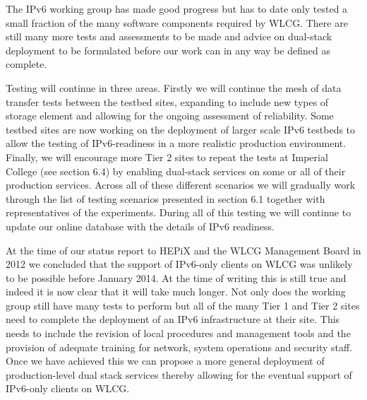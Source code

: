 The IPv6 working group has made good progress but has to date only tested a small fraction of the many 
software components required by WLCG. There are still many more tests and 
assessments to be made and advice on dual-stack deployment to be formulated before 
our work can in any way be defined as complete.

Testing will continue in three areas. Firstly we will continue the mesh of data transfer tests between
the testbed sites, expanding to include new types of storage element and allowing for the ongoing
assessment of reliability. Some testbed sites are now working on the deployment of larger scale IPv6 testbeds
to allow the testing of IPv6-readiness in a more realistic production environment. Finally, we will encourage 
more Tier 2 sites to repeat the
tests at Imperial College (see section 6.4) by enabling dual-stack services on some or all of their production
services. Across all of these different scenarios we will gradually work through the list of testing scenarios presented
in section 6.1 together with representatives of the experiments.  During all of this testing we
will continue to update our online database with the details of IPv6 readiness.

At the time of our status report to HEPiX and the WLCG Management Board in 2012 we concluded that
the support of IPv6-only clients on WLCG was unlikely to be possible before January 2014. At the time of writing this is still true and indeed it is now clear that it will take much longer. Not only does the working group still have many tests to perform
but all of the many Tier 1 and Tier 2 sites need to complete the deployment of an IPv6 infrastructure at their site. This needs to include
the revision of local procedures and management tools and the provision of adequate training for network,
system operations and security staff. Once we have achieved this we can propose a more general deployment of 
production-level dual stack services thereby allowing for the eventual support of IPv6-only clients on WLCG.
